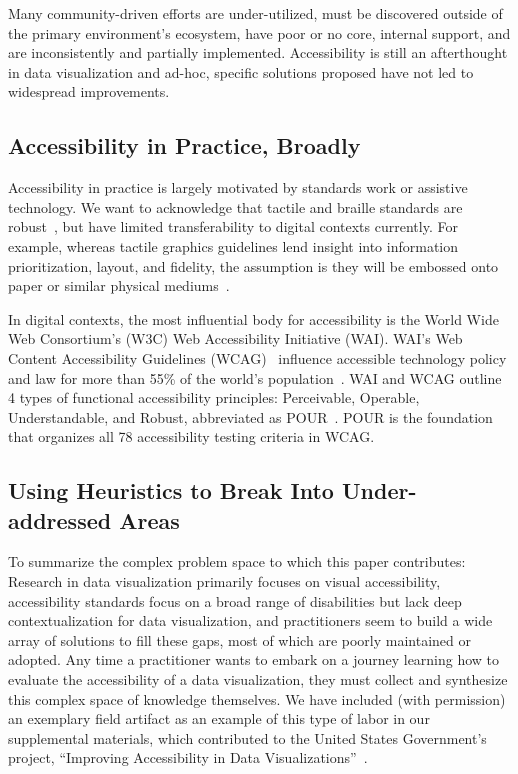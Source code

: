 \documentclass[12pt]{cmuthesis}
\begin{document}
Many community-driven efforts are under-utilized, must be discovered outside of the primary environment’s ecosystem, have poor or no core, internal support, and are inconsistently and partially implemented. Accessibility is still an afterthought in data visualization and ad-hoc, specific solutions proposed have not led to widespread improvements.

\subsection{Accessibility in Practice, Broadly}
Accessibility in practice is largely motivated by standards work or assistive technology. We want to acknowledge that tactile and braille standards are robust~\cite{BANA2010Guidelines}, but have limited transferability to digital contexts currently. For example, whereas tactile graphics guidelines lend insight into information prioritization, layout, and fidelity, the assumption is they will be embossed onto paper or similar physical mediums~\cite{Bigham2010VizWiz,Lundgard2019Sociotechnical,Sharif2021}.

In digital contexts, the most influential body for accessibility is the World Wide Web Consortium’s (W3C) Web Accessibility Initiative (WAI). WAI’s Web Content Accessibility Guidelines (WCAG)~\cite{WCAG} influence accessible technology policy and law for more than 55\% of the world’s population~\cite{Initiative2021Web}. WAI and WCAG outline 4 types of functional accessibility principles: Perceivable, Operable, Understandable, and Robust, abbreviated as POUR~\cite{InitiativePrinciples}. POUR is the foundation that organizes all 78 accessibility testing criteria in WCAG.

\subsection{Using Heuristics to Break Into Under-addressed Areas}
To summarize the complex problem space to which this paper contributes: Research in data visualization primarily focuses on visual accessibility, accessibility standards focus on a broad range of disabilities but lack deep contextualization for data visualization, and practitioners seem to build a wide array of solutions to fill these gaps, most of which are poorly maintained or adopted. Any time a practitioner wants to embark on a journey learning how to evaluate the accessibility of a data visualization, they must collect and synthesize this complex space of knowledge themselves. We have included (with permission) an exemplary field artifact as an example of this type of labor in our supplemental materials, which contributed to the United States Government's project, ``Improving Accessibility in Data Visualizations''~\cite{USImproving,USData}.
\end{document}
